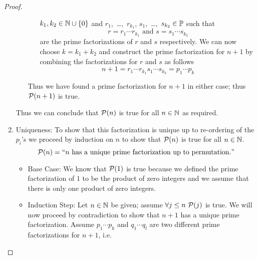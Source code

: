 \begin{proof}
\begin{enumerate}
\begin{itemize}
\begin{itemize}
                                    $k_1, k_2 \in \mathbb{N} \cup \left\{0\right\}$ and
                                    $r_1$,~\dots,~$r_{k_1}$, $s_1$,~\dots,~$s_{k_2} \in \mathbb{P}$ such that
                                    \[
                                        r = r_1 \cdots r_{k_1} \mbox{ and } s = s_1 \cdots s_{k_2}
                                    \]
                                    are the prime factorizations of $r$ and $s$ respectively. We can now choose
                                    $k = k_1 + k_2$ and construct the prime factorization for $n + 1$
                                    by combining the factorizations for $r$ and $s$ as follows
                                    \[
                                        n + 1 = r_1 \cdots r_{k_1} s_1 \cdots s_{k_2} = p_1 \cdots p_{k}
                                    \]
                            \end{itemize}
                            Thus we have found a prime factorization for $n + 1$ in either case;
                            thus $\mathcal{P}(n + 1)$ is true.
                    \end{itemize}
                    Thus we can conclude that $\mathcal{P}(n)$ is true for all $n \in \mathbb{N}$
                    as required.
                \item
                    Uniqueness: To show that this factorization is unique up to re-ordering
                    of the $p_i$'s we proceed by induction on $n$ to show that $\mathcal{P}(n)$
                    is true for all $n \in \mathbb{N}$.
                    \[
                        \mathcal{P}(n) = ``n \mbox{ has a unique prime factorization up to permutation}."
                    \]
                    \begin{itemize}
                        \item
                            Base Case: We know that $\mathcal{P}(1)$ is true because we defined
                            the prime factorization of $1$ to be the product of zero integers and
                            we assume that there is only one product of zero integers.
                        \item
                            Induction Step: Let $n \in \mathbb{N}$ be given; assume $\forall j \le n \
                            \mathcal{P}(j)$ is true. We will now proceed by contradiction
                            to show that $n + 1$ has a unique prime factorization. Assume $p_1 \cdots p_k$ and
                            $q_1 \cdots q_l$ are two different prime factorizations for $n + 1$, i.e.

\end{itemize}
\end{enumerate}
\end{proof}
